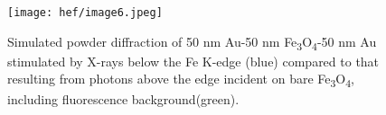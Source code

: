 \begin{figure}[h]
\caption{
Simulated powder diffraction of 50 nm Au-50 nm
Fe\textsubscript{3}O\textsubscript{4}-50 nm Au stimulated by X-rays
below the Fe K-edge (blue) compared to that resulting from photons above
the edge incident on bare Fe\textsubscript{3}O\textsubscript{4},
including fluorescence background(green).
}
\label{fig:hef_image6}
\centering
\texttt{[image: hef/image6.jpeg]}
\end{figure}



